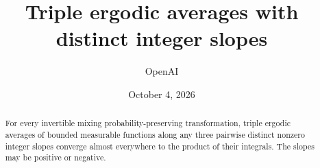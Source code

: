 \documentclass[11pt]{amsart}
\title[Triple ergodic averages with distinct slopes]{Triple ergodic averages with distinct integer slopes}
\author{OpenAI}
\date{October 4, 2026}
\theoremstyle{definition}
\theoremstyle{remark}
\numberwithin{equation}{section}
\newcommand{\1}{\mathbf 1}
\begin{document}
\begin{abstract}
For every invertible mixing probability-preserving transformation, triple
ergodic averages of bounded measurable functions along any three pairwise
distinct nonzero integer slopes converge almost everywhere to the product of
their integrals. The slopes may be positive or negative.
\end{abstract}
\maketitle







\end{document}

